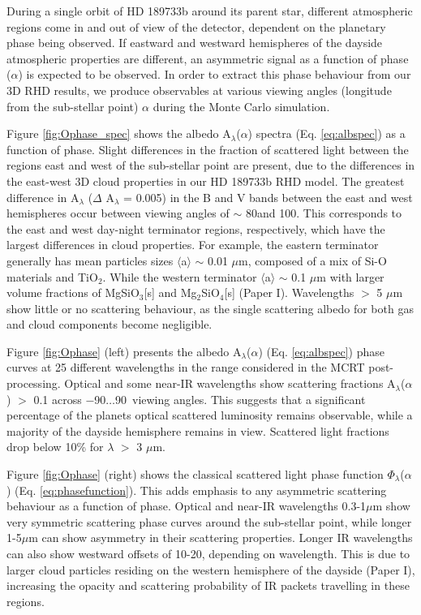 \documentclass{aa}
\begin{document}
During a single orbit of HD 189733b around its parent star, different atmospheric regions come in and out of view of the detector, dependent on the planetary phase being observed.
If eastward and westward hemispheres of the dayside atmospheric properties are different, an asymmetric signal as a function of phase ($\alpha$) is expected to be observed.
In order to extract this phase behaviour from our 3D RHD results, we produce observables at various viewing angles (longitude from the sub-stellar point) $\alpha$ during the Monte Carlo simulation.

Figure \ref{fig:Ophase_spec} shows the albedo A$_{\lambda}$($\alpha$) spectra (Eq. \ref{eq:albspec}) as a function of phase.
Slight differences in the fraction of scattered light between the regions east and west of the sub-stellar point are present, due to the differences in the east-west 3D cloud properties in our HD 189733b RHD model.
The greatest difference in A$_{\lambda}$ ($\Delta$ A$_{\lambda}$ = 0.005) in the B and V bands between the east and west hemispheres occur between viewing angles of $\sim$ 80\degr and 100\degr.
This corresponds to the east and west day-night terminator regions, respectively, which have the largest differences in cloud properties.
For example, the eastern terminator generally has mean particles sizes $\langle$a$\rangle$ $\sim$ 0.01 $\mu$m, composed of a mix of Si-O materials and TiO$_{2}$.
While the western terminator $\langle$a$\rangle$ $\sim$ 0.1 $\mu$m with larger volume fractions of MgSiO$_{3}$[s] and Mg$_{2}$SiO$_{4}$[s] (Paper I).
Wavelengths $>$ 5 $\mu$m show little or no scattering behaviour, as the single scattering albedo for both gas and cloud components become negligible.

Figure \ref{fig:Ophase} (left) presents the albedo A$_{\lambda}$($\alpha$) (Eq. \ref{eq:albspec}) phase curves at 25 different wavelengths in the range considered in the MCRT post-processing.
Optical and some near-IR wavelengths show scattering fractions A$_{\lambda}$($\alpha$) $>$ 0.1 across $-$90\degr$\ldots$90\degr\ viewing angles.
This suggests that a significant percentage of the planets optical scattered luminosity remains observable, while a majority of the dayside hemisphere remains in view.
Scattered light fractions drop below 10\% for $\lambda$ $>$ 3 $\mu$m.

Figure \ref{fig:Ophase} (right) shows the classical scattered light phase function $\Phi_{\lambda}$($\alpha$) (Eq. \ref{eq:phasefunction}).
This adds emphasis to any asymmetric scattering behaviour as a function of phase.
Optical and near-IR wavelengths 0.3-1$\mu$m show very symmetric scattering phase curves around the sub-stellar point, while longer 1-5$\mu$m can show asymmetry in their scattering properties.
Longer IR wavelengths can also show westward offsets of 10-20\degr, depending on wavelength.
This is due to larger cloud particles residing on the western hemisphere of the dayside (Paper I), increasing the opacity and scattering probability of IR packets travelling in these regions.
\end{document}
